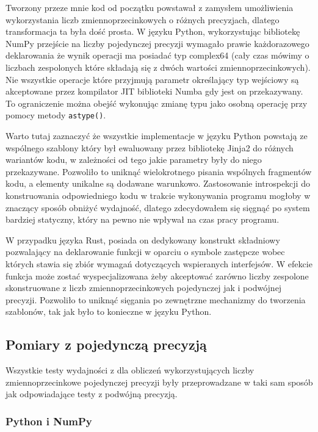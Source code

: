 \documentclass[11pt, a4paper]{article}
\newcommand{\code}[1]{\texttt{#1}}
\begin{document}
\begin{sloppypar}
    Tworzony przeze mnie kod od początku powstawał z zamysłem umożliwienia wykorzystania
    liczb zmiennoprzecinkowych o różnych precyzjach, dlatego transformacja ta była dość
    prosta. W języku Python, wykorzystując bibliotekę NumPy przejście na liczby
    pojedynczej precyzji wymagało prawie każdorazowego deklarowania że wynik operacji ma
    posiadać typ complex64 (cały czas mówimy o liczbach zespolonych które składają się z
    dwóch wartości zmiennoprzecinkowych). Nie wszystkie operacje które przyjmują parametr
    określający typ wejściowy są akceptowane przez kompilator JIT biblioteki Numba gdy jest
    on przekazywany. To ograniczenie można obejść wykonując zmianę typu jako osobną
    operację przy pomocy metody \code{astype()}.

    Warto tutaj zaznaczyć że wszystkie implementacje w języku Python powstają ze wspólnego
    szablony który był ewaluowany przez bibliotekę Jinja2 do różnych wariantów kodu, w
    zależności od tego jakie parametry były do niego przekazywane. Pozwoliło to uniknąć wielokrotnego
    pisania wspólnych fragmentów kodu, a elementy unikalne są dodawane warunkowo. Zastosowanie
    introspekcji do konstruowania odpowiedniego kodu w trakcie wykonywania programu mogłoby
    w znaczący sposób obniżyć wydajność, dlatego zdecydowałem się sięgnąć po system
    bardziej statyczny, który na pewno nie wpływał na czas pracy programu.

    W przypadku języka Rust, posiada on dedykowany konstrukt składniowy pozwalający na
    deklarowanie funkcji w oparciu o symbole zastępcze wobec których stawia się zbiór
    wymagań dotyczących wspieranych interfejsów. W efekcie funkcja może zostać wyspecjalizowana
    żeby akceptować zarówno liczby zespolone skonstruowane z liczb zmiennoprzecinkowych pojedynczej
    jak i podwójnej precyzji. Pozwoliło to uniknąć sięgania po zewnętrzne mechanizmy do
    tworzenia szablonów, tak jak było to konieczne w języku Python.

    \newpage


    \subsection{Pomiary z pojedynczą precyzją}


    Wszystkie testy wydajności z dla obliczeń wykorzystujących liczby zmiennoprzecinkowe
    pojedynczej precyzji były przeprowadzane w taki sam sposób jak odpowiadające testy z
    podwójną precyzją.

    \subsubsection{ Python i NumPy }



\end{sloppypar}
\end{document}
